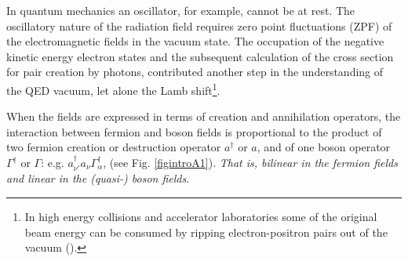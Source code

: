  In quantum mechanics an oscillator, for example, cannot be at rest. The oscillatory nature of the radiation field requires zero point fluctuations (ZPF) of the electromagnetic fields in the vacuum state. The occupation of the negative kinetic energy electron states and the subsequent calculation of the cross section for pair creation by photons, contributed another step in the understanding of the QED vacuum, let alone the Lamb shift\footnote{In high energy collisions and accelerator laboratories some of the original beam energy can be consumed by ripping electron-positron pairs out of the vacuum (\cite{Bruce:07}).}.


When the fields are expressed in terms of creation and annihilation operators, the interaction between  fermion and boson fields is proportional to the product of two fermion creation or destruction operator $a^\dagger$ or $a$, and of one boson operator $\Gamma^\dagger$ or $\Gamma$: e.g. $a^\dagger_{\nu'}a_\nu\Gamma_\alpha^\dagger$, (see Fig. \ref{figintroA1}). \textit{That is,  bilinear in the fermion fields and linear in the (quasi-) boson fields}.

